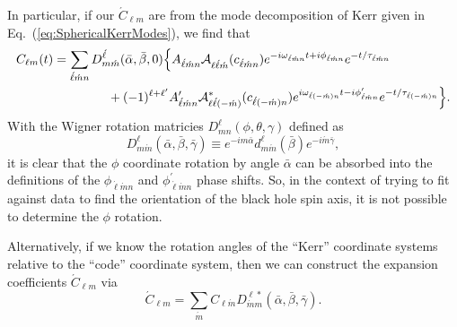\documentclass[11pt]{article}
\newcommand{\YSH}[3][]{\mathcal{A}^{#1}_{#2}(#3)}
\begin{document}
In particular, if our $\acute{C}_{\ell m}$ are from the mode decomposition
of Kerr given in Eq.~(\ref{eq:SphericalKerrModes}), we find that
\begin{equation}\label{eq:SphericalRotatedKerrModes}
\begin{aligned}
 C_{\ell{m}}(t) & = \sum_{\acute\ell\acute{m}n}
 D^{\acute\ell}_{m\acute{m}}(\bar\alpha,\bar\beta,0) \Big\{ 
   A_{\acute\ell\acute{m}n}\YSH{\ell\acute\ell\acute{m}}{c_{\acute\ell\acute{m}n}}
    e^{-i\omega_{\acute\ell\acute{m}n}t+i\phi_{\acute\ell\acute{m}n}}e^{-t/\tau_{\acute\ell\acute{m}n}} \\
& {} \hspace{0.6in}
  + (-1)^{\ell+\ell^\prime} A^\prime_{\acute\ell\acute{m}n}
    \YSH[*]{\ell\acute\ell(-\acute{m})}{c_{\acute\ell(-\acute{m})n}}
    e^{i\omega_{\acute\ell(-\acute{m})n}t-i\phi^\prime_{\acute\ell\acute{m}n}}e^{-t/\tau_{\acute\ell(-\acute{m})n}} \Big\}.
\end{aligned}
\end{equation}
With the Wigner rotation matricies $D^\ell_{mn}(\phi,\theta,\gamma)$
defined as
\begin{equation}
  D^\ell_{m\acute{m}}(\bar\alpha,\bar\beta,\bar\gamma) \equiv 
       e^{-im\bar\alpha} d^\ell_{m\acute{m}}(\bar\beta) e^{-i\acute{m}\bar\gamma},
\end{equation}
it is clear that the $\phi$ coordinate rotation by angle $\bar\alpha$
can be absorbed into the definitions of the
$\phi_{\acute\ell\acute{m}n}$ and $\phi^\prime_{\acute\ell\acute{m}n}$
phase shifts.  So, in the context of trying to fit against data to
find the orientation of the black hole spin axis, it is not possible
to determine the $\phi$ rotation.

Alternatively, if we know the rotation angles of the ``Kerr''
coordinate systems relative to the ``code'' coordinate system, then
we can construct the expansion coefficients $\acute{C}_{\ell{m}}$ via
\begin{equation}
  \acute{C}_{\ell{m}} = \sum_{\acute{m}}{C_{\ell\acute{m}}
                      D^{\ell{*}}_{\acute{m}m}(\bar\alpha,\bar\beta,\bar\gamma)}.
\end{equation}


\newpage
{}
\vspace{0.25in}
\end{document}
